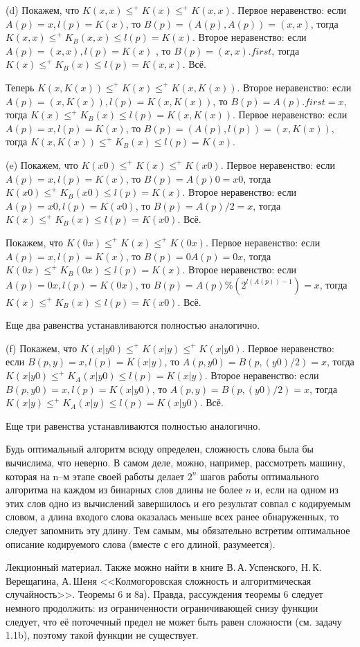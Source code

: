 (d) Покажем, что $K(x,x) \le^+ K(x) \le^+ K(x,x)$. Первое неравенство: если $A(p)=x, l(p)=K(x)$, то $B(p)=(A(p), A(p))=(x,x)$, тогда  $K(x,x)\le^+ K_B(x,x)\le l(p)=K(x)$. Второе неравенство: если $A(p)=(x,x), l(p)=K(x)$ , то $B(p)=(x,x).first$, тогда  $K(x)\le^+ K_B(x)\le l(p)=K(x,x).$ Всё.

Теперь $K(x,K(x)) \le^+ K(x) \le^+ K(x,K(x))$. Второе неравенство: если $A(p)=(x,K(x)), l(p)=K(x,K(x))$, то $B(p)=A(p).first=x$, тогда  $K(x)\le^+ K_B(x)\le l(p)=K(x,K(x))$. Первое неравенство: если $A(p)=x, l(p)=K(x)$, то $B(p)=(A(p),l(p))=(x,K(x))$, тогда  $K(x,K(x))\le^+ K_B(x)\le l(p)=K(x)$.

(e) Покажем, что $K(x0) \le^+ K(x) \le^+ K(x0)$. Первое неравенство: если $A(p)=x, l(p)=K(x)$, то $B(p)=A(p)0=x0$, тогда  $K(x0)\le^+ K_B(x0)\le l(p)=K(x)$. Второе неравенство: если $A(p)=x0, l(p)=K(x0)$, то $B(p)=A(p)/2=x$, тогда  $K(x)\le^+ K_B(x)\le l(p)=K(x0).$ Всё.

Покажем, что $K(0x) \le^+ K(x) \le^+ K(0x)$. Первое неравенство: если $A(p)=x, l(p)=K(x)$, то $B(p)=0A(p)=0x$, тогда $K(0x)\le^+ K_B(0x)\le l(p)=K(x)$. Второе неравенство: если $A(p)=0x, l(p)=K(0x)$, то $B(p)=A(p)\%(2^{l(A(p))-1})=x$, тогда  $K(x)\le^+ K_B(x)\le l(p)=K(x0).$ Всё.

Еще два равенства устанавливаются полностью аналогично.

(f) Покажем, что $K(x|y0) \le^+ K(x|y) \le^+ K(x|y0)$. Первое неравенство: если $B(p,y)=x, l(p)=K(x|y)$, то $A(p,y0)=B(p,(y0)/2)=x$, тогда  $K(x|y0)\le^+ K_A(x|y0)\le l(p)=K(x|y)$. Второе неравенство: если $B(p,y0)=x, l(p)=K(x|y0)$, то $A(p,y) = B(p,(y0)/2) = x$, тогда  $K(x|y)\le^+ K_A(x|y)\le l(p)=K(x|y0).$ Всё.

Еще три равенства устанавливаются полностью аналогично.


Будь оптимальный алгоритм всюду определен, сложность слова была бы вычислима, что неверно. В самом деле, можно, например, рассмотреть машину, которая на n--м этапе своей работы делает $2^n$ шагов работы оптимального алгоритма на каждом из бинарных слов длины не более $n$ и, если на одном из этих слов одно из вычислений завершилось и его результат совпал с кодируемым словом, а длина входого слова оказалась меньше всех ранее обнаруженных, то следует запомнить эту длину. Тем самым, мы обязательно встретим оптимальное описание кодируемого слова (вместе с его длиной, разумеется).

Лекционный материал. Также можно найти в книге В.\,А.\,Успенского, Н.\,К.\,Верещагина, А.\,Шеня <<Колмогоровская сложность и алгоритмическая случайность>>. Теоремы 6 и 8а). Правда, рассуждения теоремы 6 следует немного продолжить: из ограниченности ограничивающей снизу функции следует, что её поточечный предел не может быть равен сложности (см. задачу 1.1b), поэтому такой функции не существует.


